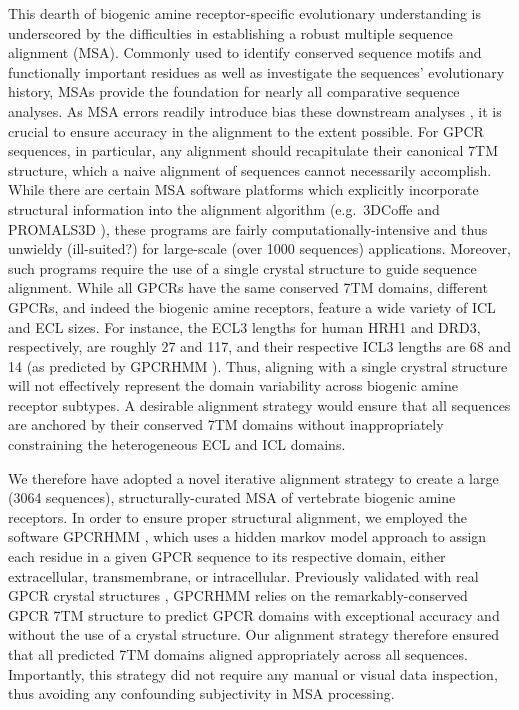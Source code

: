 \documentclass[fleqn,10pt]{wlpeerj}
\begin{document}
This dearth of biogenic amine receptor-specific evolutionary understanding is underscored by the difficulties in establishing a robust multiple sequence alignment (MSA). Commonly used to identify conserved sequence motifs and functionally important residues as well as investigate the sequences' evolutionary history, MSAs provide the foundation for nearly all comparative sequence analyses. As MSA errors readily introduce bias these downstream analyses \citep{Ogden2006, Wong2008, Jordan2012}, it is crucial to ensure accuracy in the alignment to the extent possible. For GPCR sequences, in particular, any alignment should recapitulate their canonical 7TM structure, which a naive alignment of sequences cannot necessarily accomplish. While there are certain MSA software platforms which explicitly incorporate structural information into the alignment algorithm (e.g.\ 3DCoffe \citep{3dcoffee} and PROMALS3D \citep{promals3d}), these programs are fairly computationally-intensive and thus unwieldy (ill-suited?) for large-scale (over 1000 sequences) applications. Moreover, such programs require the use of a single crystal structure to guide sequence alignment. While all GPCRs have the same conserved 7TM domains, different GPCRs, and indeed the biogenic amine receptors, feature a wide variety of ICL and ECL sizes. For instance, the ECL3 lengths for human HRH1 and DRD3, respectively, are roughly 27 and 117, and their respective ICL3 lengths are 68 and 14 (as predicted by GPCRHMM \citep{Wistrand2006}). Thus, aligning with a single crystral structure will not effectively represent the domain variability across biogenic amine receptor subtypes. A desirable alignment strategy would ensure that all sequences are anchored by their conserved 7TM domains without inappropriately constraining the heterogeneous ECL and ICL domains.

We therefore have adopted a novel iterative alignment strategy to create a large (3064 sequences), structurally-curated MSA of vertebrate biogenic amine receptors. In order to ensure proper structural alignment, we employed the software GPCRHMM \citep{Wistrand2006}, which uses a hidden markov model approach to assign each residue in a given GPCR sequence to its respective domain, either extracellular, transmembrane, or intracellular. Previously validated with real GPCR crystal structures \citep{SpielmanWilke2013}, GPCRHMM relies on the remarkably-conserved GPCR 7TM structure to predict GPCR domains with exceptional accuracy and without the use of a crystal structure. Our alignment strategy therefore ensured that all predicted 7TM domains aligned appropriately across all sequences. Importantly, this strategy did not require any manual or visual data inspection, thus avoiding any confounding subjectivity in MSA processing. 
\end{document}
